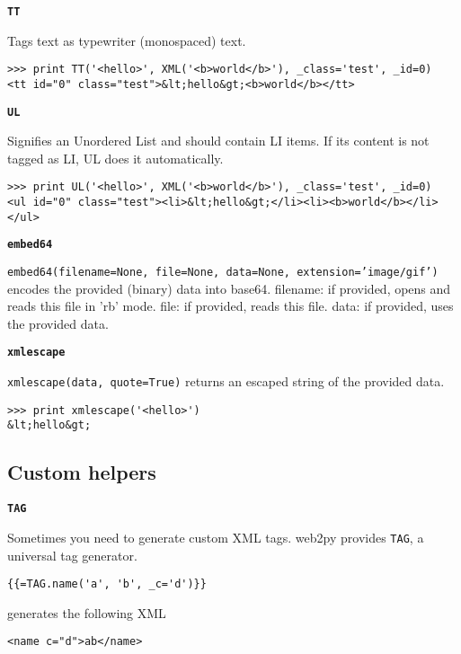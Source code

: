 \documentclass[justified,sixbynine,notoc]{tufte-book}
\def\ft{\small\tt}
\def\inxx#1{\index{#1}}
\begin{document}
\begin{fullwidth}
{\bf {\ft TT}}

\inxx{TT}

Tags text as typewriter (monospaced) text.
\begin{lstlisting}
>>> print TT('<hello>', XML('<b>world</b>'), _class='test', _id=0)
<tt id="0" class="test">&lt;hello&gt;<b>world</b></tt>
\end{lstlisting}

{\bf {\ft UL}}

Signifies an Unordered List and should contain LI items. If its content is not tagged as LI, UL does it automatically.

\inxx{UL}
\begin{lstlisting}
>>> print UL('<hello>', XML('<b>world</b>'), _class='test', _id=0)
<ul id="0" class="test"><li>&lt;hello&gt;</li><li><b>world</b></li></ul>
\end{lstlisting}

{\bf {\ft embed64}}

{\ft embed64(filename=None, file=None, data=None, extension='image/gif')} encodes the provided (binary) data into base64.
\noindent filename: if provided, opens and reads this file in 'rb' mode.
file: if provided, reads this file.
data: if provided, uses the provided data.

\inxx{embed64}

{\bf {\ft xmlescape}}

{\ft xmlescape(data, quote=True)} returns an escaped string of the provided data.

\inxx{xmlescape}
\begin{lstlisting}
>>> print xmlescape('<hello>')
&lt;hello&gt;
\end{lstlisting}

\goodbreak\subsection{Custom helpers}

{\bf {\ft TAG}}

\inxx{TAG}

Sometimes you need to generate custom XML tags. web2py provides {\ft TAG}, a universal tag generator.
\begin{lstlisting}[keywords={}]
{{=TAG.name('a', 'b', _c='d')}}
\end{lstlisting}
\noindent generates the following XML
\begin{lstlisting}[keywords={}]
<name c="d">ab</name>
\end{lstlisting}


\end{fullwidth}
\end{document}
